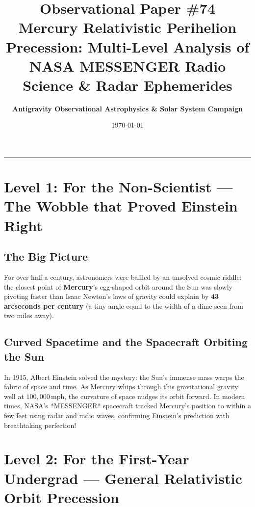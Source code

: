 \documentclass[11pt,a4paper]{article}
\title{\Huge \textbf{Observational Paper \#74}\\ \Large Mercury Relativistic Perihelion Precession: Multi-Level Analysis of NASA MESSENGER Radio Science \& Radar Ephemerides}
\author{\textbf{Antigravity Observational Astrophysics \& Solar System Campaign}}
\date{\today}
\begin{document}
\maketitle

\vspace{-1em}
\begin{center}
\rule{\textwidth}{1.5pt}
\end{center}

\section*{Level 1: For the Non-Scientist — The Wobble that Proved Einstein Right}

\subsection*{The Big Picture}
For over half a century, astronomers were baffled by an unsolved cosmic riddle: the closest point of \textbf{Mercury}'s egg-shaped orbit around the Sun was slowly pivoting faster than Isaac Newton's laws of gravity could explain by \textbf{43 arcseconds per century} (a tiny angle equal to the width of a dime seen from two miles away).

\subsection*{Curved Spacetime and the Spacecraft Orbiting the Sun}
In 1915, Albert Einstein solved the mystery: the Sun's immense mass warps the fabric of space and time. As Mercury whips through this gravitational gravity well at $100{,}000\,\text{mph}$, the curvature of space nudges its orbit forward. In modern times, NASA's *MESSENGER* spacecraft tracked Mercury's position to within a few feet using radar and radio waves, confirming Einstein's prediction with breathtaking perfection!

\newpage

\section*{Level 2: For the First-Year Undergrad — General Relativistic Orbit Precession}
\end{document}
